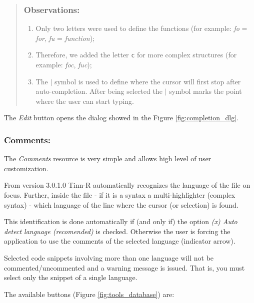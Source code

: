 \begin{quote}
\begin{footnotesize}
\begin{description}
        \subsubsection{Observations:}
        \begin{enumerate}
          \item Only two letters were used to define the functions (for example:
            \textit{fo} = \textit{for}, \textit{fu} = \textit{function});
          \item Therefore, we added the letter \texttt{c} for more complex
            structures (for example: \textit{foc}, \textit{fuc});
          \item The \texttt{$|$} symbol is used to define where the cursor
            will first stop after auto-completion. After being selected
            the \texttt{$|$} symbol marks the point where the user can start
            typing.
        \end{enumerate}
    \end{description}
  \end{footnotesize}
\end{quote}

The \textit{Edit} button opens the dialog showed in the Figure \ref{fig:completion_dlg}.


\subsubsection{Comments:}
The \textit{Comments} resource is very simple and allows high level
of user customization.

From version 3.0.1.0 Tinn-R automatically recognizes the
language of the file on focus. Further, inside the file
- if it is a syntax a multi-highlighter (complex syntax) - which language of
the line where the cursor (or selection) is found.

This identification is done automatically if (and only if) the option
\textit{(x) Auto detect language (recomended)} is checked. Otherwise
the user is forcing the application to use the comments of the selected language
(indicator arrow).

Selected code snippets involving more than one language will not be commented/uncommented
and a warning message is issued. That is, you must select only the snippet of a single language.

The available buttons
(Figure \ref{fig:tools_database})
are:

